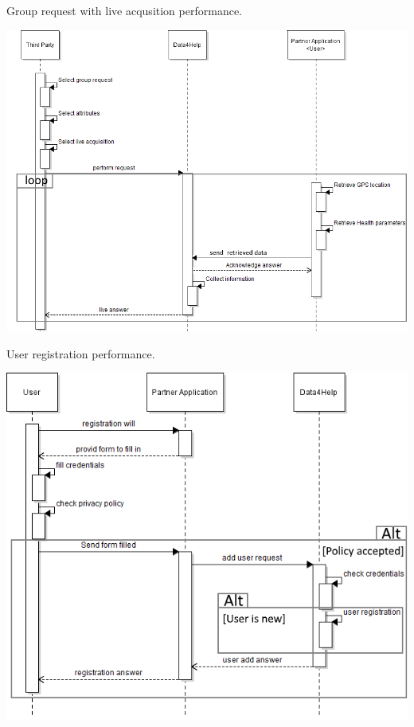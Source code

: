 \begin{enumerate}
\begin{minipage}{\textwidth}
\end{minipage}

\begin{minipage}{\textwidth}
\FloatBarrier
Group request with live acqusition performance.
\begin{center}
\includegraphics[scale=0.72]{Images/Seq_Data4Help_live.png}
\end{center}

\FloatBarrier
User registration performance.
\begin{center}
\includegraphics[scale=0.72]{Images/Seq_Data4Help_registration.png}
\end{center}



\end{minipage}
\end{enumerate}
